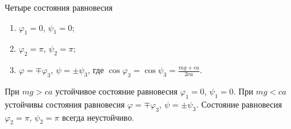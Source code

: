 Четыре состояния равновесия
\begin{enumerate}
	\item $\varphi _1 = 0$, $\psi _1 = 0$;
	\item $\varphi _2 = \pi$, $\psi _2 = \pi$;
	\item $\varphi = \mp\varphi _3$, $\psi = \pm \psi _3$,
	где $\cos{\varphi _3} = \cos{\psi _3} = \frac{mg + ca}{2ca}$.
\end{enumerate}
При $mg > ca$ устойчивое состояние равновесия $\varphi _1 = 0$, $\psi _1 = 0$.
При $mg < ca$ устойчивы состояния равновесия
$\varphi = \mp\varphi _3$, $\psi = \pm \psi _3$.
Состояние равновесия $\varphi _2 = \pi$, $\psi _2 = \pi$
всегда неустойчиво.
